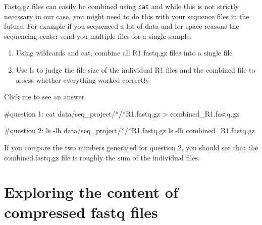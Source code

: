 \documentclass[
  letterpaper,
  DIV=11,
  numbers=noendperiod]{scrreprt}
\newenvironment{Shaded}{}{}
\newcommand{\AttributeTok}[1]{\textcolor[rgb]{0.84,0.23,0.29}{#1}}
\newcommand{\CommentTok}[1]{\textcolor[rgb]{0.42,0.45,0.49}{#1}}
\newcommand{\FunctionTok}[1]{\textcolor[rgb]{0.44,0.26,0.76}{#1}}
\newcommand{\NormalTok}[1]{\textcolor[rgb]{0.14,0.16,0.18}{#1}}
\newcommand{\OperatorTok}[1]{\textcolor[rgb]{0.14,0.16,0.18}{#1}}
\newcommand{\PreprocessorTok}[1]{\textcolor[rgb]{0.84,0.23,0.29}{#1}}
\providecommand{\tightlist}{%
  \setlength{\itemsep}{0pt}\setlength{\parskip}{0pt}}\usepackage{longtable,booktabs,array}
\begin{document}
\begin{tcolorbox}[enhanced jigsaw, breakable, left=2mm, title=\textcolor{quarto-callout-caution-color}{\faFire}\hspace{0.5em}{Exercise}, opacityback=0, opacitybacktitle=0.6, rightrule=.15mm, bottomrule=.15mm, colback=white, colframe=quarto-callout-caution-color-frame, coltitle=black, bottomtitle=1mm, arc=.35mm, toprule=.15mm, colbacktitle=quarto-callout-caution-color!10!white, toptitle=1mm, titlerule=0mm, leftrule=.75mm]

Fastq.gz files can easily be combined using \texttt{cat} and while this
is not strictly necessary in our case, you might need to do this with
your sequence files in the future. For example if you sequenced a lot of
data and for space reasons the sequencing center send you multiple files
for a single sample.

\begin{enumerate}
\def\labelenumi{\arabic{enumi}.}
\tightlist
\item
  Using wildcards and cat, combine all R1 fastq.gz files into a single
  file
\item
  Use ls to judge the file size of the individual R1 files and the
  combined file to assess whether everything worked correctly
\end{enumerate}

Click me to see an answer

\begin{Shaded}
\begin{Highlighting}[]
\CommentTok{\#question 1:}
\FunctionTok{cat}\NormalTok{ data/seq\_project/}\PreprocessorTok{*}\NormalTok{/}\PreprocessorTok{*}\NormalTok{R1.fastq.gz }\OperatorTok{\textgreater{}}\NormalTok{ combined\_R1.fastq.gz}

\CommentTok{\#question 2:}
\FunctionTok{ls} \AttributeTok{{-}lh}\NormalTok{ data/seq\_project/}\PreprocessorTok{*}\NormalTok{/}\PreprocessorTok{*}\NormalTok{R1.fastq.gz}
\FunctionTok{ls} \AttributeTok{{-}lh}\NormalTok{ combined\_R1.fastq.gz}
\end{Highlighting}
\end{Shaded}

If you compare the two numbers generated for question 2, you should see
that the combined.fastq.gz file is roughly the sum of the individual
files.

\end{tcolorbox}

\section{Exploring the content of compressed fastq
files}\label{exploring-the-content-of-compressed-fastq-files}
\end{document}

